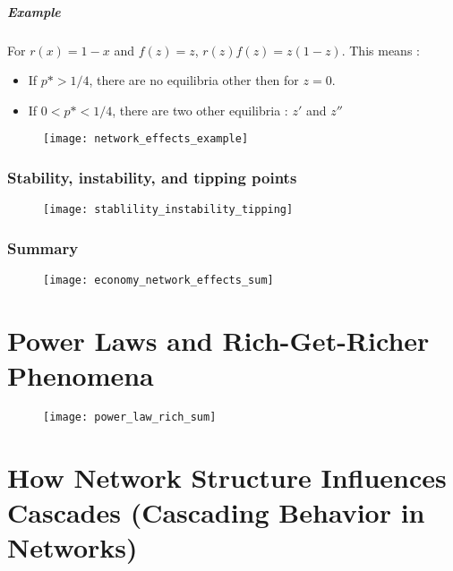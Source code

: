 \paragraph{Example}

For $r(x) = 1-x$ and $f(z) = z$, $r(z)f(z) = z(1-z)$. This means :
\begin{itemize}
\item If $p* > 1/4$, there are no equilibria other then for $z=0$.
\item If $0 < p* < 1/4$, there are two other equilibria : $z'$ and $z''$
\end{itemize}

\begin{figure}[H]
    \centering
    \texttt{[image: network\_effects\_example]}
\end{figure}

\subsection{Stability, instability, and tipping points}

\begin{figure}[H]
    \centering
    \texttt{[image: stablility\_instability\_tipping]}
\end{figure}

\subsection{Summary}

\begin{figure}[H]
    \centering
    \texttt{[image: economy\_network\_effects\_sum]}
\end{figure}

\chapter{Power Laws and Rich-Get-Richer Phenomena}

\begin{figure}[H]
    \centering
    \texttt{[image: power\_law\_rich\_sum]}
\end{figure}

\chapter{How Network Structure Influences Cascades (Cascading Behavior in Networks)}

